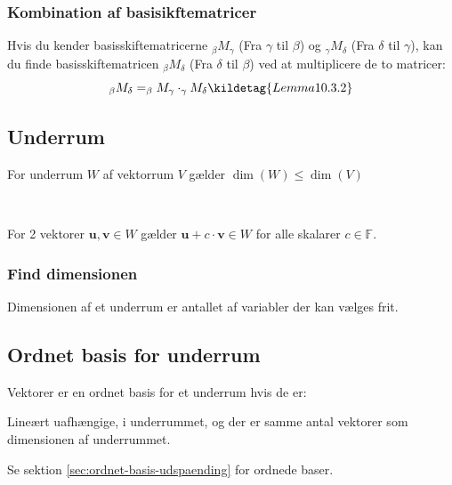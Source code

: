 \subsubsection{Kombination af basisikftematricer}
Hvis du kender basisskiftematricerne $_\beta M _\gamma$ (Fra $\gamma$ til $\beta$) og $_\gamma M _\delta$ (Fra $\delta$ til $\gamma$), kan du finde basisskiftematricen $_\beta M _\delta$ (Fra $\delta$ til $\beta$) ved at multiplicere de to matricer:
\[_\beta M _\delta = _\beta M _\gamma \cdot _\gamma M _\delta \kildetag{Lemma 10.3.2}\]

\subsection{Underrum}
For underrum $W$ af vektorrum $V$ gælder $\dim(W) \leq \dim(V)$


\

For 2 vektorer $\mathbf{u}, \mathbf{v} \in W$ gælder $\mathbf{u} + c \cdot \mathbf{v} \in W$ for alle skalarer $c \in \mathbb{F}$.



\subsubsection{Find dimensionen}
Dimensionen af et underrum er antallet af variabler der kan vælges frit.


\subsection{Ordnet basis for underrum}
Vektorer er en ordnet basis for et underrum hvis de er:

Lineært uafhængige, i underrummet, og der er samme antal vektorer som dimensionen af underrummet.

Se sektion \ref{sec:ordnet-basis-udspaending} for ordnede baser.

